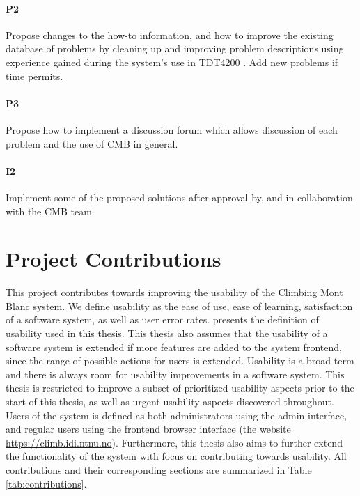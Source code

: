 \paragraph*{P2}  Propose changes to the how-to information, and how to improve the existing database of problems by cleaning up and improving problem descriptions using experience gained during the system's use in TDT4200 \cite{TDT4200}. Add new problems if time permits.

\paragraph*{P3} Propose how to implement a discussion forum which allows discussion of each problem and the use of CMB in general.

\paragraph*{I2} Implement some of the proposed solutions after approval by, and in collaboration with the CMB team. \\

\section{Project Contributions}
\label{sec:cont}
This project contributes towards improving the usability of the Climbing Mont Blanc system. We define usability as the ease of use, ease of learning, satisfaction of a software system, as well as user error rates.  presents the definition of usability used in this thesis. This thesis also assumes that the usability of a software system is extended if more features are added to the system frontend, since the range of possible actions for users is extended. Usability is a broad term and there is always room for usability improvements in a software system. This thesis is restricted to improve a subset of prioritized usability aspects prior to the start of this thesis, as well as urgent usability aspects discovered throughout. \\

Users of the system is defined as both administrators using the admin interface, and regular users using the frontend browser interface (the website \url{https://climb.idi.ntnu.no}). Furthermore, this thesis also aims to further extend the functionality of the system with focus on contributing towards usability. All contributions and their corresponding sections are summarized in Table \ref{tab:contributions}. \\

